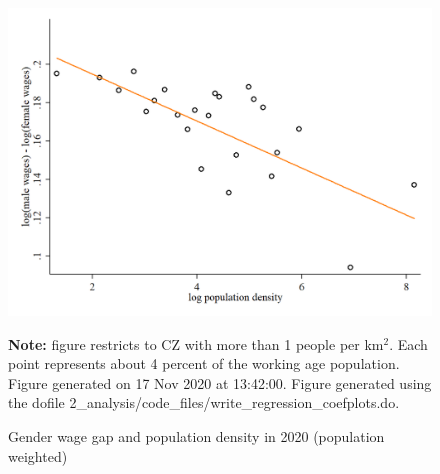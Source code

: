 \begin{figure}[!h]
\centering
\caption{Gender wage gap and population density in 2020 (population weighted)}
\includegraphics[width=1\textwidth]{../2_analysis/output/figures/l_czone_density_2020_w}
\par \begin{minipage}[h]{\textwidth}{\tiny\textbf{Note:} figure restricts to CZ with more than 1 people per km$^2$. Each point represents about 4 percent of the working age population. Figure generated on 17 Nov 2020 at 13:42:00. Figure generated using the dofile 2\_analysis/code\_files/write\_regression\_coefplots.do.}\end{minipage}
\end{figure}

